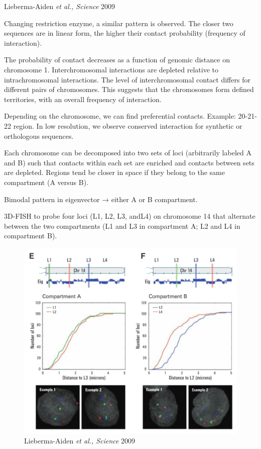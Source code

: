 Lieberma-Aiden \emph{et al., Science} 2009

Changing restriction enzyme, a similar pattern is observed. The closer two sequences are in linear form, the higher their contact probability (frequency of interaction).

The probability of contact decreases as a function of genomic distance on chromosome 1. Interchromosomal interactions are depleted relative to intrachromosomal interactions. The level of interchromosomal contact differs for different pairs of chromosomes. This suggests that the chromosomes form defined territories, with an overall frequency of interaction.

Depending on the chromosome, we can find preferential contacts. Example: 20-21-22 region. In low resolution, we observe conserved interaction for synthetic or orthologous sequences.

Each chromosome can be decomposed into two sets of loci (arbitrarily labeled A and B) such that contacts within each set are enriched and contacts between sets are depleted. Regions tend be closer in space if they belong to the same compartment (A versus B).

Bimodal pattern in eigenvector → either A or B compartment.

3D-FISH to probe four loci (L1, L2, L3, andL4) on chromosome 14 that alternate between the two compartments (L1 and L3 in compartment A; L2 and L4 in compartment B).

\begin{figure}
\centering
\includegraphics[width=\textwidth]{../_resources/Screenshot_2022-10-19_at_09-06-00.png}
\caption{Lieberma-Aiden \emph{et al., Science} 2009}
\end{figure}

